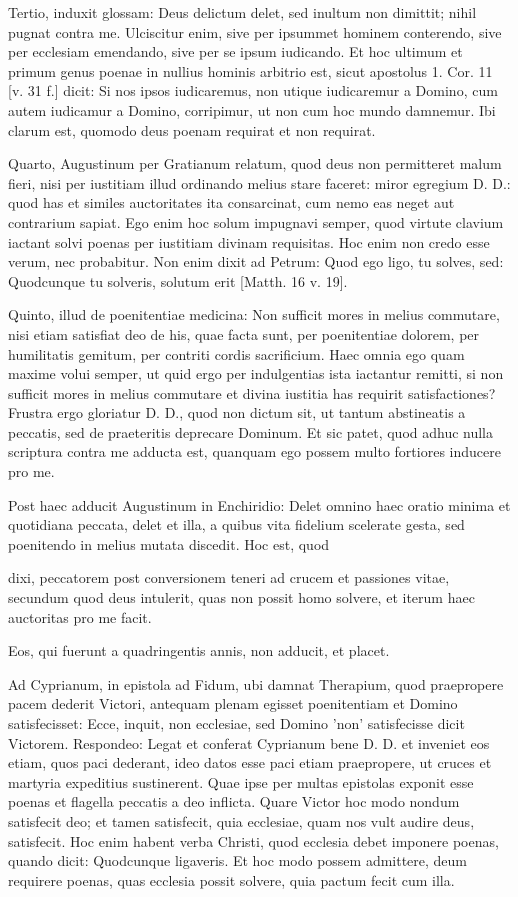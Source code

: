 Tertio, induxit glossam: Deus delictum delet, sed inultum non dimittit; nihil pugnat contra me. Ulciscitur enim, sive per ipsummet hominem conterendo, sive per ecclesiam emendando, sive per se ipsum iudicando. Et hoc ultimum et primum genus poenae in nullius hominis arbitrio est, sicut apostolus 1. Cor. 11 [v. 31 f.] dicit: Si nos ipsos iudicaremus, non utique iudicaremur a Domino, cum autem iudicamur a Domino, corripimur, ut non cum hoc mundo damnemur. Ibi clarum est, quomodo deus poenam requirat et non requirat.

Quarto, Augustinum per Gratianum relatum, quod deus non permitteret malum fieri, nisi per iustitiam illud ordinando melius stare faceret: miror egregium D. D.: quod has et similes auctoritates ita consarcinat, cum nemo eas neget aut contrarium sapiat. Ego enim hoc solum impugnavi semper, quod virtute \marginpar{\small[377]} clavium iactant solvi poenas per iustitiam divinam requisitas. Hoc enim non credo esse verum, nec probabitur. Non enim dixit ad Petrum: Quod ego ligo, tu solves, sed: Quodcunque tu solveris, solutum erit [Matth. 16 v. 19].

Quinto, illud de poenitentiae medicina: Non sufficit mores in melius commutare, nisi etiam satisfiat deo de his, quae facta sunt, per poenitentiae dolorem, per humilitatis gemitum, per contriti cordis sacrificium. Haec omnia ego quam maxime volui semper, ut quid ergo per indulgentias ista iactantur remitti, si non sufficit mores in melius commutare et divina iustitia has requirit satisfactiones? Frustra ergo gloriatur D. D., quod non dictum sit, ut tantum abstineatis a peccatis, sed de praeteritis deprecare Dominum. Et sic patet, quod adhuc nulla scriptura contra me adducta est, quanquam ego possem multo fortiores inducere pro me.

Post haec adducit Augustinum in Enchiridio: Delet omnino haec oratio minima et quotidiana peccata, delet et illa, a quibus vita fidelium scelerate gesta, sed poenitendo in melius mutata discedit. Hoc est, quod

dixi, peccatorem post conversionem teneri ad crucem et passiones vitae, secundum quod deus intulerit, quas non possit homo solvere, et iterum haec auctoritas pro me facit.

Eos, qui fuerunt a quadringentis annis, non adducit, et placet.

Ad Cyprianum, in epistola ad Fidum, ubi damnat Therapium, quod praepropere pacem dederit Victori, antequam plenam egisset poenitentiam et Domino satisfecisset: Ecce, inquit, non ecclesiae, sed Domino 'non' satisfecisse dicit Victorem. Respondeo: Legat et conferat Cyprianum bene D. D. et inveniet eos etiam, quos paci dederant, ideo datos esse paci etiam praepropere, ut cruces et martyria expeditius sustinerent. Quae ipse per multas epistolas exponit esse poenas et flagella peccatis a deo inflicta. Quare Victor hoc modo nondum satisfecit deo; et tamen satisfecit, quia ecclesiae, quam nos vult audire deus, satisfecit. Hoc enim habent verba Christi, quod ecclesia debet imponere poenas, quando dicit: Quodcunque ligaveris. Et hoc modo possem admittere, deum requirere poenas, quas ecclesia possit solvere, quia pactum fecit cum illa.

